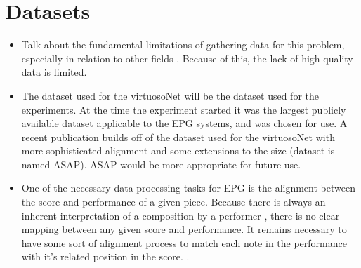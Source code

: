 \section{Datasets}
\begin{itemize}
    \item Talk about the fundamental limitations of gathering data for this problem, especially in relation to other fields \cite{friberg2006overview}. Because of this, the lack of high quality data is limited. 
    \item The dataset used for the virtuosoNet \cite{jeong2019graph} \cite{jeong2019virtuosonet} will be the dataset used for the experiments. At the time the experiment started it was the largest publicly available dataset applicable to the EPG systems, and was chosen for use. A recent publication \cite{foscarin2020asap} builds off of the dataset used for the virtuosoNet with more sophisticated alignment and some extensions to the size (dataset is named ASAP). ASAP would be more appropriate for future use. 
    \item One of the necessary data processing tasks for EPG is the alignment between the score and performance of a given piece. Because there is always an inherent interpretation of a composition by a performer , there is no clear mapping between any given score and performance. It remains necessary to have some sort of alignment process to match each note in the performance with it's related position in the score. .
\end{itemize}

